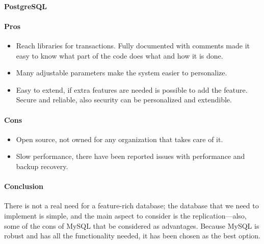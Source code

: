 \paragraph{ PostgreSQL \cite{sdpost}} 

\paragraph{Pros}

\begin{itemize}
\item Reach libraries for transactions. Fully documented with comments made it easy to know what part of the code does what and how it is done.
\item  Many adjustable parameters make the system easier to personalize. 
\item Easy to extend, if extra features are needed is possible to add the feature. Secure and reliable, also security can be personalized and extendible.
\end{itemize}
\paragraph{Cons}

\begin{itemize}
\item Open source, not owned for any organization that takes care of it. 
\item Slow performance, there have been reported issues with performance and backup recovery.
\end{itemize}


\paragraph{Conclusion}

\indent
\indent
There is not a real need for a feature-rich database; the database that we need to implement is simple, and the main aspect to consider is the replication—also, some of the cons of MySQL that be considered as advantages. Because MySQL is robust and has all the functionality needed, it has been chosen as the best option.
